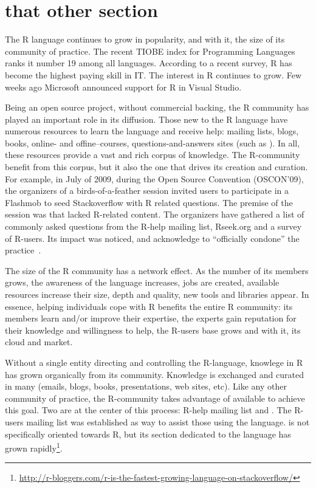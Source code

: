 \section{that other section}

The R language continues to grow in popularity, and with it, the size of its community of practice. The recent TIOBE index for Programming Languages ranks it
number 19 among all languages.  According to a recent survey, R has become the highest paying skill in IT. The interest in R continues to grow. Few weeks ago
Microsoft announced support for R in Visual Studio\cite{r-microsot}.

Being an open source project, without commercial backing, the R community has played an important role in its diffusion. Those new to the R language have
numerous resources to learn the language and receive help: mailing lists, blogs, books, online- and offine--courses, questions-and-answers sites (such as
\SO). In all, these resources provide a vast and rich corpus of knowledge. The R-community benefit from this corpus, but it also the one that drives its
creation and curation.  For example, in July of 2009, during the Open Source Convention (OSCON'09), the organizers of a birds-of-a-feather session invited users
to participate in a Flashmob to seed Stackoverflow with R related questions\cite{rflashmob09}. The premise of the session was that \SO lacked R-related
content. The organizers have gathered a list of commonly asked questions from the R-help mailing list, Rseek.org and a survey of R-users. Its impact was
noticed, and \SO acknowledge to ``officially condone'' the practice~\cite{soFlashmob09}.

The size of the R community has a network effect. As the number of its members grows, the awareness of the language increases, jobs are created, available
resources increase their size, depth and quality, new tools and libraries appear. In essence, helping individuals cope with R benefits the entire R
community: its members learn and/or improve their expertise, the experts gain reputation for their knowledge and willingness to help, the R-users base grows and
with it, its cloud and market.

Without a single entity directing and controlling the R-language, knowlege in R has grown organically from its community. Knowledge is exchanged and curated in
many \channels (emails, blogs, books, presentations, web sites, etc). Like any other community of practice, the R-community takes advantage of available \channels
to achieve this goal.
Two \channels are at the center of this process: R-help mailing list and \SO. The R-users mailing list was established  as way to assist those using
the language. \SO is not specifically oriented towards R, but its section dedicated to the language has grown rapidly\footnote{\href{http://r-bloggers.com/r-is-the-fastest-growing-language-on-stackoverflow/}{http://r-bloggers.com/r-is-the-fastest-growing-language-on-stackoverflow/}}.

